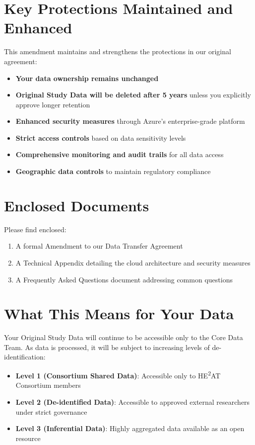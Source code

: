 \documentclass[12pt,letterpaper]{article}
\begin{document}
\section*{Key Protections Maintained and Enhanced}

This amendment maintains and strengthens the protections in our original agreement:

\begin{itemize}
\item \textbf{Your data ownership remains unchanged}
\item \textbf{Original Study Data will be deleted after 5 years} unless you explicitly approve longer retention
\item \textbf{Enhanced security measures} through Azure's enterprise-grade platform
\item \textbf{Strict access controls} based on data sensitivity levels
\item \textbf{Comprehensive monitoring and audit trails} for all data access
\item \textbf{Geographic data controls} to maintain regulatory compliance
\end{itemize}

\section*{Enclosed Documents}

Please find enclosed:
\begin{enumerate}
\item A formal Amendment to our Data Transfer Agreement
\item A Technical Appendix detailing the cloud architecture and security measures
\item A Frequently Asked Questions document addressing common questions
\end{enumerate}

\section*{What This Means for Your Data}

Your Original Study Data will continue to be accessible only to the Core Data Team. As data is processed, it will be subject to increasing levels of de-identification:

\begin{itemize}
\item \textbf{Level 1 (Consortium Shared Data)}: Accessible only to HE\textsuperscript{2}AT Consortium members
\item \textbf{Level 2 (De-identified Data)}: Accessible to approved external researchers under strict governance
\item \textbf{Level 3 (Inferential Data)}: Highly aggregated data available as an open resource
\end{itemize}
\end{document}
